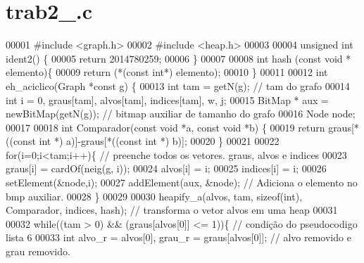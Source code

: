 \section{trab2\+\_.\+c}
\label{trab2__2014780259_8c_source}

\begin{DoxyCode}
00001 \textcolor{preprocessor}{#include <graph.h>}
00002 \textcolor{preprocessor}{#include <heap.h>}
00003 
00004 \textcolor{keywordtype}{unsigned} \textcolor{keywordtype}{int} ident2() \{
00005         \textcolor{keywordflow}{return} 2014780259;
00006 \}
00007 
00008 \textcolor{keywordtype}{int} hash (\textcolor{keyword}{const} \textcolor{keywordtype}{void} * elemento)\{
00009     \textcolor{keywordflow}{return} (*(\textcolor{keyword}{const} \textcolor{keywordtype}{int}*) elemento);
00010 \}
00011 
00012 \textcolor{keywordtype}{int} eh_aciclico(Graph *\textcolor{keyword}{const} g) \{
00013     \textcolor{keywordtype}{int} tam = getN(g); \textcolor{comment}{// tam do grafo}
00014     \textcolor{keywordtype}{int} i = 0, graus[tam], alvos[tam], indices[tam], w, j;
00015     BitMap * aux = newBitMap(getN(g)); \textcolor{comment}{// bitmap auxiliar de tamanho do grafo}
00016     Node node;
00017 
00018     \textcolor{keywordtype}{int} Comparador(\textcolor{keyword}{const} \textcolor{keywordtype}{void} *a, \textcolor{keyword}{const} \textcolor{keywordtype}{void} *b) \{
00019         \textcolor{keywordflow}{return} graus[*((\textcolor{keyword}{const} \textcolor{keywordtype}{int} *) a)]-graus[*((\textcolor{keyword}{const} \textcolor{keywordtype}{int} *) b)];
00020     \}
00021 
00022     \textcolor{keywordflow}{for}(i=0;i<tam;i++)\{ \textcolor{comment}{// preenche todos os vetores. graus, alvos e indices}
00023         graus[i] = cardOf(neig(g, i));
00024         alvos[i] = i;
00025         indices[i] = i;
00026         setElement(&node,i);
00027         addElement(aux, &node); \textcolor{comment}{// Adiciona o elemento no bmp auxiliar. }
00028     \}    
00029 
00030     heapify_a(alvos, tam, \textcolor{keyword}{sizeof}(\textcolor{keywordtype}{int}), Comparador, indices, hash); \textcolor{comment}{// transforma o vetor alvos em uma heap}
00031 
00032     \textcolor{keywordflow}{while}((tam > 0) && (graus[alvos[0]] <= 1))\{    \textcolor{comment}{// condição do pseudocodigo lista 6}
00033         \textcolor{keywordtype}{int} alvo\_r = alvos[0], grau\_r = graus[alvos[0]]; \textcolor{comment}{// alvo removido e grau removido.}

\end{DoxyCode}
